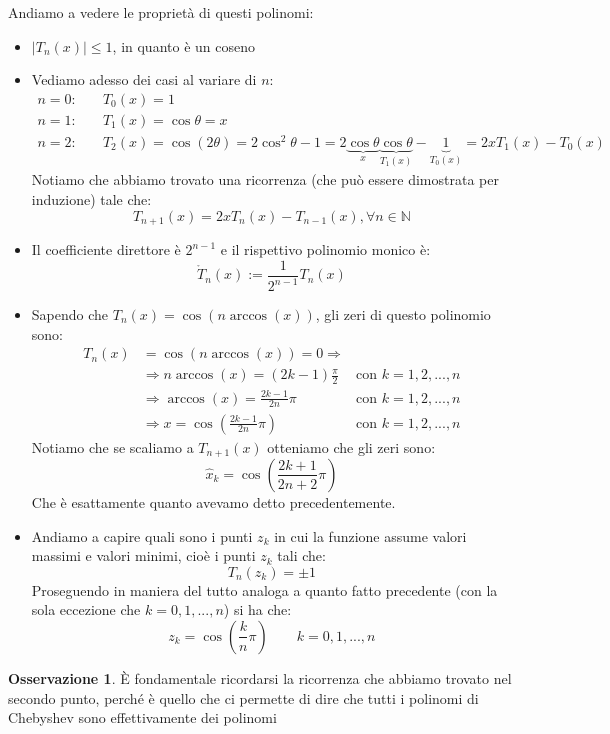 \documentclass[11pt,a4paper,twoside]{article}
\theoremstyle{definition}
\newtheorem*{oss}{Osservazione}
\begin{document}
Andiamo a vedere le proprietà di questi polinomi:
\begin{itemize}
	\item $|T_n(x)|\leq 1$, in quanto è un coseno
	\item Vediamo adesso dei casi al variare di $n$:
		\begin{align*}
			n = 0: & \quad T_0(x) = 1\\
			n = 1: & \quad T_1(x) = \cos \theta = x\\
			n = 2: & \quad T_2(x) = \cos(2\theta)= 2\cos^2 \theta - 1 = 2\underbrace{\cos \theta}_{x} \underbrace{\cos \theta}_{T_1(x)} - \underbrace{1}_{T_0(x)} = 2x T_1(x) - T_0(x)
		\end{align*}
		Notiamo che abbiamo trovato una ricorrenza (che può essere dimostrata per induzione) tale che:
		\[ T_{n+1}(x) = 2x T_n(x) - T_{n-1}(x) , \forall n \in \mathbb N\]
	\item Il coefficiente direttore è $2^{n-1}$ e il rispettivo polinomio monico è:
		\[ \mathring T_n(x):= \frac 1{2^{n-1}} T_n(x)\]
	\item Sapendo che $T_n(x) = \cos(n \arccos(x))$, gli zeri di questo polinomio sono:
		\begin{align*}
			T_n(x) &= \cos(n \arccos(x)) = 0 \Rightarrow\\
			& \Rightarrow n \arccos(x) = (2k-1)\frac \pi 2 & \text{con }k =1,2,...,n\\
			& \Rightarrow \arccos(x) = \frac{2k-1}{2n} \pi & \text{con }k = 1,2,...,n\\
			& \Rightarrow x = \cos \left( \frac{2k-1}{2n}\pi \right) & \text{con }k = 1,2,...,n
		\end{align*}
		Notiamo che se scaliamo a $T_{n+1}(x)$ otteniamo che gli zeri sono:
		\[ \hat x_k = \cos\left( \frac{2k+1}{2n+2}\pi \right) \]
		Che è esattamente quanto avevamo detto precedentemente.
	\item Andiamo a capire quali sono i punti $z_k$ in cui la funzione assume valori massimi e valori minimi, cioè i punti $z_k$ tali che:
		\[ T_n(z_k) = \pm 1 \]
		Proseguendo in maniera del tutto analoga a quanto fatto precedente (con la sola eccezione che $k = 0,1,...,n$) si ha che:
		\[ z_k = \cos\left( \frac kn \pi \right) \qquad k = 0,1,...,n\]
\end{itemize}

\begin{oss}
	È fondamentale ricordarsi la ricorrenza che abbiamo trovato nel secondo punto, perché è quello che ci permette di dire che tutti i polinomi di Chebyshev sono effettivamente dei polinomi
\end{oss}
\end{document}
